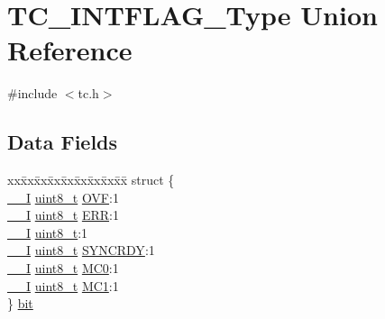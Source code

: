 \hypertarget{union_t_c___i_n_t_f_l_a_g___type}{}\section{T\+C\+\_\+\+I\+N\+T\+F\+L\+A\+G\+\_\+\+Type Union Reference}
\label{union_t_c___i_n_t_f_l_a_g___type}


{\ttfamily \#include $<$tc.\+h$>$}

\subsection*{Data Fields}
\begin{DoxyCompactItemize}
\item 
\begin{tabbing}
xx\=xx\=xx\=xx\=xx\=xx\=xx\=xx\=xx\=\kill
struct \{\\
\>\mbox{\hyperlink{core__cm0plus_8h_af63697ed9952cc71e1225efe205f6cd3}{\_\_I}} \mbox{\hyperlink{union_t_c___i_n_t_f_l_a_g___type_a5b4208c6f4c4a4290c4f2804d1eb1d5b}{uint8\_t}} \mbox{\hyperlink{union_t_c___i_n_t_f_l_a_g___type_a52c588fc013d003e33ea581b20d4ba73}{OVF}}:1\\
\>\mbox{\hyperlink{core__cm0plus_8h_af63697ed9952cc71e1225efe205f6cd3}{\_\_I}} \mbox{\hyperlink{union_t_c___i_n_t_f_l_a_g___type_a5b4208c6f4c4a4290c4f2804d1eb1d5b}{uint8\_t}} \mbox{\hyperlink{union_t_c___i_n_t_f_l_a_g___type_a0dc2084c046851eefc1d94742580db25}{ERR}}:1\\
\>\mbox{\hyperlink{core__cm0plus_8h_af63697ed9952cc71e1225efe205f6cd3}{\_\_I}} \mbox{\hyperlink{union_t_c___i_n_t_f_l_a_g___type_a5b4208c6f4c4a4290c4f2804d1eb1d5b}{uint8\_t}}:1\\
\>\mbox{\hyperlink{core__cm0plus_8h_af63697ed9952cc71e1225efe205f6cd3}{\_\_I}} \mbox{\hyperlink{union_t_c___i_n_t_f_l_a_g___type_a5b4208c6f4c4a4290c4f2804d1eb1d5b}{uint8\_t}} \mbox{\hyperlink{union_t_c___i_n_t_f_l_a_g___type_ae8a10cfa0bb63130ae1e8150943d680b}{SYNCRDY}}:1\\
\>\mbox{\hyperlink{core__cm0plus_8h_af63697ed9952cc71e1225efe205f6cd3}{\_\_I}} \mbox{\hyperlink{union_t_c___i_n_t_f_l_a_g___type_a5b4208c6f4c4a4290c4f2804d1eb1d5b}{uint8\_t}} \mbox{\hyperlink{union_t_c___i_n_t_f_l_a_g___type_a0c40f9589c09a7eeb732fbb9f537cda9}{MC0}}:1\\
\>\mbox{\hyperlink{core__cm0plus_8h_af63697ed9952cc71e1225efe205f6cd3}{\_\_I}} \mbox{\hyperlink{union_t_c___i_n_t_f_l_a_g___type_a5b4208c6f4c4a4290c4f2804d1eb1d5b}{uint8\_t}} \mbox{\hyperlink{union_t_c___i_n_t_f_l_a_g___type_aa3b7f1787322948d34ddb5abe8e35609}{MC1}}:1\\
\} \mbox{\hyperlink{union_t_c___i_n_t_f_l_a_g___type_aa629e8167fbca0cf3e215692b75c65fc}{bit}}\\


\end{tabbing}
\end{DoxyCompactItemize}
